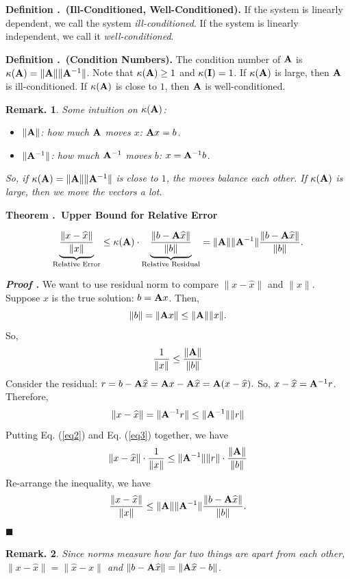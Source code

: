 \documentclass[12pt, a4paper]{article}
\newcounter{index}[subsection]
\newenvironment*{df}[1]{\par\noindent\textbf{Definition \thesubsection.\stepcounter{index}\theindex\ (#1).}}{\par}
\newenvironment*{thm}[1]{\begin{tcolorbox}\par\noindent\textbf{Theorem \thesubsection.\stepcounter{index}\theindex\ #1} \par}{\par\end{tcolorbox}}
\newcounter{nprf}[subsection]
\newenvironment*{prf}{\par\indent\textbf{\textit{Proof \stepcounter{nprf}\thenprf.}}}{\hfill$\blacksquare$\par}
\newtheorem{rmk}{Remark.}[section]
\def\A{\vb A}
\def\hat{\widehat}
\begin{document}
\begin{df}{Ill-Conditioned, Well-Conditioned}
	If the system is linearly dependent, we call the system \textit{ill-conditioned}. If the system is linearly independent, we call it \textit{well-conditioned}.	
\end{df}
\begin{df}{Condition Numbers}
	The condition number of $\A$ is $\kappa\qty(\A)=\|\A\|\|\A^{-1}\|$. Note that $\kappa(\A)\geq1$ and $\kappa(\vb I)=1$. If $\kappa(\A)$ is large, then $\A$ is ill-conditioned. If $\kappa(\A)$ is close to $1$, then $\A$ is well-conditioned. 	
\end{df}
\begin{rmk}
	Some intuition on $\kappa(\A)$: 
	\begin{itemize}
		\item $\|\A\|$: how much $\A$ moves $x$: $\A x=b$.
		\item $\|\A^{-1}\|$: how much $\A^{-1}$ moves $b$: $x=\A^{-1}b$.
	\end{itemize}
	So, if $\kappa(\A)=\|\A\|\|\A^{-1}\|$ is close to $1$, the moves balance each other. If $\kappa(\A)$ is large, then we move the vectors a lot. 
\end{rmk}
\begin{thm}{Upper Bound for Relative Error}
	\[\underbrace{\dfrac{\|x-\hat{x}\|}{\|x\|}}_\text{Relative Error}\leq\kappa(\A)\cdot\underbrace{\dfrac{\|b-\A\hat{x}\|}{\|b\|}}_\text{Relative Residual}=\|\A\|\|\A^{-1}\|\dfrac{\|b-\A\hat{x}\|}{\|b\|}.\]	
\end{thm}
\begin{prf}
	We want to use residual norm to compare $\|x-\hat{x}\|$ and $\|x\|$. Suppose $x$ is the true solution: $b=\A x$. Then, \[\|b\|=\|\A x\|\leq\|\A\|\|x\|.\] So, \begin{equation}\label{eq2}\dfrac{1}{\|x\|}\leq\dfrac{\|\A\|}{\|b\|}\end{equation} Consider the residual: $r=b-\A\hat{x}=\A x-\A\hat{x}=\A\qty(x-\hat{x}).$ So, $x-\hat{x}=\A^{-1}r$. Therefore, \begin{equation}\label{eq3}\|x-\hat{x}\|=\|\A^{-1}r\|\leq\|\A^{-1}\|\|r\|\end{equation} Putting Eq. (\ref{eq2}) and Eq. (\ref{eq3}) together, we have \[\|x-\hat{x}\|\cdot\dfrac{1}{\|x\|}\leq\|\A^{-1}\|\|r\|\cdot\dfrac{\|\A\|}{\|b\|}\] Re-arrange the inequality, we have \[\dfrac{\|x-\hat{x}\|}{\|x\|}\leq\|\A\|\|\A^{-1}\|\dfrac{\|b-\A\hat{x}\|}{\|b\|}.\]
\end{prf}
\begin{rmk}
	Since norms measure how far two things are apart from each other, $\|x-\hat{x}\|=\|\hat{x}-x\|$ and $\|b-\A\hat{x}\|=\|\A\hat{x}-b\|$.
\end{rmk}
\end{document}
